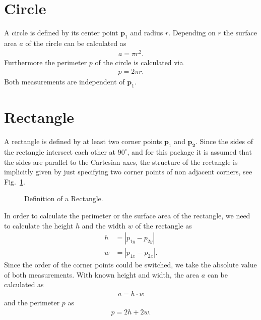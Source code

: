\section{Circle}
A circle is defined by its center point $\mathbf{p}_1$ and radius $r$. Depending on $r$ the surface area $a$ of the circle can be calculated as
\begin{align}
    a =\pi r^2.
\end{align}
Furthermore the perimeter $p$ of the circle is calculated via
\begin{align}
    p = 2 \pi r.
\end{align}
Both measurements are independent of $\mathbf{p}_1$.
\section{Rectangle}
A rectangle is defined by at least two corner points $\mathbf{p}_1$ and $\mathbf{p_2}$. Since the sides of the rectangle intersect each other at $90^{\circ}$, and for this package it is assumed that the sides are parallel to the Cartesian axes, the structure of the rectangle is implicitly given by just specifying two corner points of non adjacent corners, see Fig.~\ref{fig:rectangle}.
\begin{figure}[hbt]
    \centering
    \caption{Definition of a Rectangle.}
    \label{fig:rectangle}
\end{figure}
In order to calculate the perimeter or the surface area of the rectangle, we need to calculate the height $h$ and the width $w$ of the rectangle as
\begin{align}
    h &= |p_{1y} - p_{2y}| \\
    w &= |p_{1x} - p_{2x}|.
\end{align}
Since the order of the corner points could be switched, we take the absolute value of both measurements. With known height and width, the area $a$ can be calculated as 
\begin{align}
    a = h \cdot w
\end{align}
and the perimeter $p$ as
\begin{align}
    p = 2h + 2w.
\end{align}
